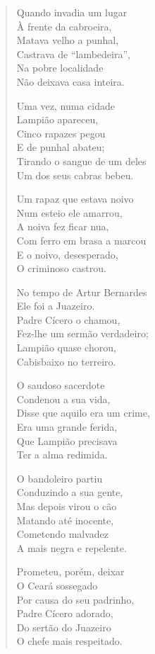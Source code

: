 \begin{verse}
Quando invadia um lugar\\
À frente da cabroeira,\\
Matava velho a punhal,\\
Castrava de “lambedeira”, \\
Na pobre localidade\\
Não deixava casa inteira.

Uma vez, numa cidade\\
Lampião apareceu,\\
Cinco rapazes pegou\\
E de punhal abateu;\\
Tirando o sangue de um deles\\
Um dos seus cabras bebeu.

Um rapaz que estava noivo \\
Num esteio ele amarrou,\\
A noiva fez ficar nua,\\
Com ferro em brasa a marcou\\
E o noivo, desesperado,\\
O criminoso castrou.

No tempo de Artur Bernardes\\
Ele foi a Juazeiro.\\
Padre Cícero o chamou,\\
Fez-lhe um sermão verdadeiro;\\
Lampião quase chorou,\\
Cabisbaixo no terreiro.
\pagebreak

O saudoso sacerdote\\
Condenou a sua vida,\\
Disse que aquilo era um crime,\\
Era uma grande ferida,\\
Que Lampião precisava\\
Ter a alma redimida.

O bandoleiro partiu\\
Conduzindo a sua gente,\\
Mas depois virou o cão\\
Matando até inocente,\\
Cometendo malvadez\\
A mais negra e repelente.

Prometeu, porém, deixar\\
O Ceará sossegado\\
Por causa do seu padrinho,\\
Padre Cícero adorado,\\
Do sertão do Juazeiro\\
O chefe mais respeitado.


\end{verse}

